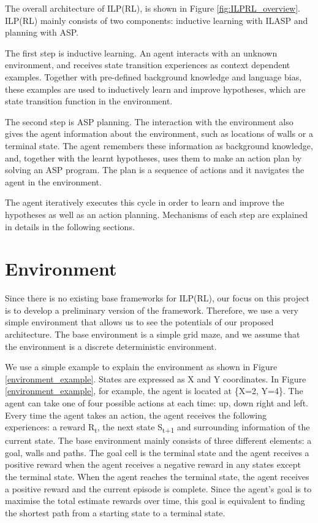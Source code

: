 The overall architecture of ILP(RL), is shown in Figure \ref{fig:ILPRL_overview}. 
ILP(RL) mainly consists of two components: inductive learning with ILASP and planning with ASP. 

The first step is inductive learning. An agent interacts with an unknown environment, 
and receives state transition experiences as context dependent examples. 
Together with pre-defined background knowledge and language bias, these examples are used to inductively learn and improve hypotheses, which are state transition function in the environment.

The second step is ASP planning. The interaction with the environment also gives the agent information about the environment, such as locations of walls or a terminal state. 
The agent remembers these information as background knowledge, and, 
together with the learnt hypotheses, uses them to make an action plan by solving an ASP program.
The plan is a sequence of actions and it navigates the agent in the environment.

The agent iteratively executes this cycle in order to learn and improve the hypotheses as well as an action planning. 
Mechanisms of each step are explained in details in the following sections.

\section{Environment}
\label{sec:environment}
Since there is no existing base frameworks for ILP(RL), our focus on this project is to develop a preliminary version of the framework. 
Therefore, we use a very simple environment that allows us to see the potentials of our proposed architecture.
The base environment is a simple grid maze, and we assume that the environment is a discrete deterministic environment. 

We use a simple example to explain the environment as shown in Figure \ref{environment_example}.
States are expressed as X and Y coordinates. In Figure \ref{environment_example}, for example, the agent is located at \{X=2, Y=4\}.
The agent can take one of four possible actions at each time: up, down right and left.
Every time the agent takes an action, the agent receives the following experiences: a reward R\textsubscript{t}, the next state S\textsubscript{t+1} and surrounding information of the current state.
The base environment mainly consists of three different elements: a goal, walls and paths.
The goal cell is the terminal state and the agent receives a positive reward when the agent receives a negative reward in any states except the terminal state.
When the agent reaches the terminal state, the agent receives a positive reward and the current episode is complete. 
Since the agent's goal is to maximise the total estimate rewards over time, this goal is equivalent to finding the shortest path from a starting state to a terminal state.

